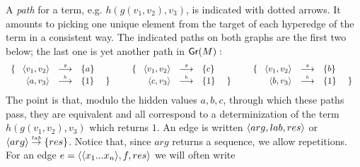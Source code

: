 \documentclass[10pt]{article}
\begin{document}
A {\em path} for a term, e.g. $h(g(v_1,v_2),v_3)$, is indicated with 
dotted arrows. It amounts to picking one unique element from the 
target of each hyperedge of the term in a consistent way.
The indicated paths on both graphs are the first two below; the last 
one is yet another path in ${\sf Gr}(M):$
\[\begin{array}{l@{\hspace*{2em}}l@{\hspace*{2em}}l}
\ngr{ \hypa{{v_{1},v_{2}}}{g}{{a}} \\ \hypa{a,v_{3}}{h}{1} } & 
\ngr{  \hypa{{v_{1},v_{2}}}{g}{c} \\ \hypa{c,v_{3}}{h}{1}  } &
\ngr{ \hypa{{v_{1},v_{2}}}{g}{{b}} \\ \hypa{b,v_{3}}{h}{1} } 
\end{array}
\]
The point is that, modulo the hidden values $a,b,c$, through which 
these paths pass, they are equivalent and all correspond to a
determinization of the term $h(g(v_1,v_2),v_3)$ which returns $1$.
%
An edge is written 
$\langle arg,lab,res\rangle$ or $\langle arg\rangle\stackrel{\mbox{\tiny $lab$}}{\rightarrow}\{res\}$.
Notice that, since $arg$ returns a sequence, we allow repetitions.
%
For an edge $e=\langle\langle x_{1}...x_{n}\rangle,f, res\rangle$ we will often write
\end{document}
